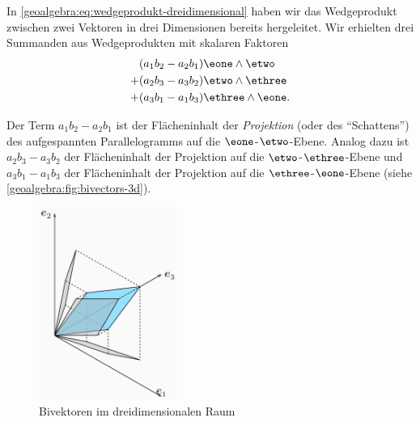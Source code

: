 In \eqref{geoalgebra:eq:wedgeprodukt-dreidimensional} haben wir das Wedgeprodukt zwischen zwei Vektoren
in drei Dimensionen bereits hergeleitet. Wir erhielten drei Summanden aus Wedgeprodukten mit skalaren Faktoren
\begin{align*}
&(a_1 b_2 - a_2 b_1) \eone \wedge \etwo \\
+&(a_2 b_3 - a_3 b_2) \etwo \wedge \ethree \\
+&(a_3 b_1 - a_1 b_3) \ethree \wedge \eone.
\end{align*}

Der Term $a_1 b_2 - a_2 b_1$ ist der Flächeninhalt der \emph{Projektion} (oder des ``Schattens'') des aufgespannten Parallelogramms auf die $\eone$-$\etwo$-Ebene.
Analog dazu ist $a_2 b_3 - a_3 b_2$ der Flächeninhalt der Projektion auf die $\etwo$-$\ethree$-Ebene und $a_3 b_1 - a_1 b_3$ der Flächeninhalt
der Projektion auf die $\ethree$-$\eone$-Ebene (siehe \autoref{geoalgebra:fig:bivectors-3d}).




\begin{figure}[h]
  \centering
  \includegraphics[width=0.4\textwidth]{papers/geoalgebra/assets/bivectors-3d.png}
  \caption{Bivektoren im dreidimensionalen Raum}
  \label{geoalgebra:fig:bivectors-3d}
\end{figure}
